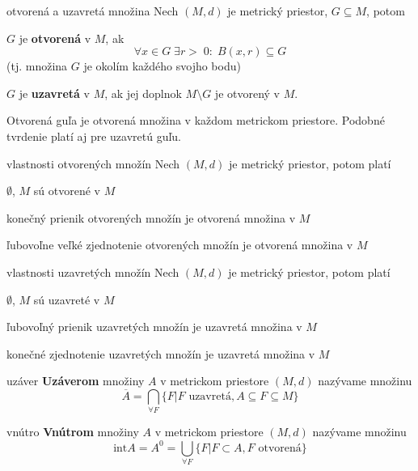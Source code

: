 \begin{definiciaN}{otvorená a uzavretá množina}
Nech $(M,d)$ je metrický priestor, $G \subseteq M$, potom
\begin{pitemize}
\item $G$ je \textbf{otvorená} v $M$, ak
$$\forall x \in G\;\exists r >\;0:\; B(x,r)\subseteq G$$
(tj. množina $G$ je okolím každého svojho bodu)
\item $G$ je \textbf{uzavretá} v $M$, ak jej doplnok $M \setminus G$ je otvorený v $M$.
\end{pitemize}
\par\medskip\noindent
Otvorená guľa je otvorená množina v každom metrickom priestore. Podobné tvrdenie platí aj pre uzavretú guľu.
\end{definiciaN}

\begin{vetaSKN}{vlastnosti otvorených množín}
Nech $(M,d)$ je metrický priestor, potom platí
\begin{penumerate}
\item $\emptyset$, $M$ sú otvorené v $M$
\item konečný prienik otvorených množín je otvorená množina v $M$
\item ľubovoľne veľké zjednotenie otvorených množín je otvorená množina v $M$
\end{penumerate}
\end{vetaSKN}

\begin{vetaSKN}{vlastnosti uzavretých množín}
Nech $(M,d)$ je metrický priestor, potom platí
\begin{penumerate}
\item $\emptyset$, $M$ sú uzavreté v $M$
\item ľubovoľný prienik uzavretých množín je uzavretá množina v $M$
\item konečné zjednotenie uzavretých množín je uzavretá množina v $M$
\end{penumerate}
\end{vetaSKN}

\begin{definiciaN}{uzáver}
\textbf{Uzáverom} množiny $A$ v metrickom priestore $(M,d)$ nazývame množinu
$$\overline{A} = \bigcap_{\forall F}\{F|F \text{ uzavretá}, A \subseteq F \subseteq M\}$$
\end{definiciaN}

\begin{definiciaN}{vnútro}
\textbf{Vnútrom} množiny $A$ v metrickom priestore $(M,d)$ nazývame množinu
$$\mathrm{int }A = A^0 = \bigcup_{\forall F}\{F|F \subset A, F \text{ otvorená}\}$$
\end{definiciaN}

